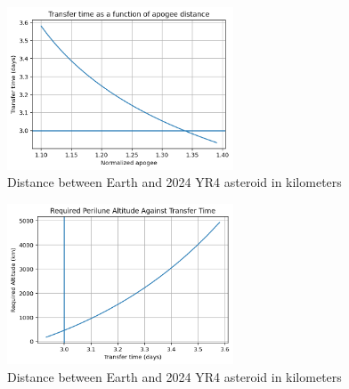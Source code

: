 \documentclass[a4paper, 12pt]{article}  %
\begin{document}
\begin{figure}[H]
    \centering
    \includegraphics[width=0.6\textwidth]{Images/222-time.png}
    \caption{Distance between Earth and 2024 YR4 asteroid in kilometers}
    \label{fig:example}
\end{figure}

\begin{figure}[H]
    \centering
    \includegraphics[width=0.6\textwidth]{Images/223-altitude.png}
    \caption{Distance between Earth and 2024 YR4 asteroid in kilometers}
    \label{fig:example}
\end{figure}
\end{document}
